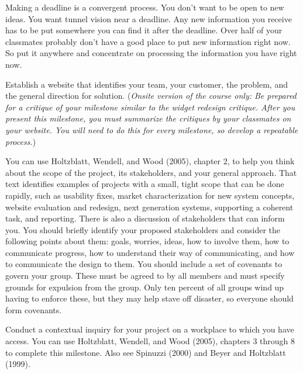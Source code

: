 Making a deadline is a convergent process. You don't want to be open to
new ideas. You want tunnel vision near a deadline. Any new information
you receive has to be put somewhere you can find it after the deadline.
Over half of your classmates probably don't have a good place to put new
information right now. So put it anywhere and concentrate on processing
the information you have right now.

\hypertarget{milestone-1.-project-focus}{%
\label{milestone-1.-project-focus}}

Establish a website that identifies your team, your customer, the
problem, and the general direction for solution. (\emph{Onsite version
of the course only: Be prepared for a critique of your milestone similar
to the widget redesign critique. After you present this milestone, you
must summarize the critiques by your classmates on your website. You
will need to do this for every milestone, so develop a repeatable
process.})

You can use Holtzblatt, Wendell, and Wood (2005), chapter 2, to help you
think about the scope of the project, its stakeholders, and your general
approach. That text identifies examples of projects with a small, tight
scope that can be done rapidly, such as usability fixes, market
characterization for new system concepts, website evaluation and
redesign, next generation systems, supporting a coherent task, and
reporting. There is also a discussion of stakeholders that can inform
you. You should briefly identify your proposed stakeholders and consider
the following points about them: goals, worries, ideas, how to involve
them, how to communicate progress, how to understand their way of
communicating, and how to communicate the design to them. You should
include a set of covenants to govern your group. These must be agreed to
by all members and must specify grounds for expulsion from the group.
Only ten percent of all groups wind up having to enforce these, but they
may help stave off disaster, so everyone should form covenants.

\hypertarget{milestone-2.-contextual-inquiry}{%
\label{milestone-2.-contextual-inquiry}}

Conduct a contextual inquiry for your project on a workplace to which
you have access. You can use Holtzblatt, Wendell, and Wood (2005),
chapters 3 through 8 to complete this milestone. Also see Spinuzzi
(2000) and Beyer and Holtzblatt (1999).

